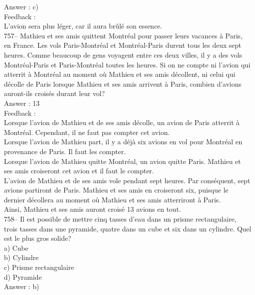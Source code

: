 ﻿\documentclass[letterpaper, 12pt]{article}
\begin{document}
Answer : c)\\

Feedback : \\
L'avion sera plus l\'eger, car il aura br\^ul\'e son essence.\\

757-- Mathieu et ses amis quittent Montr\'eal pour passer leurs vacances \`a
Paris, en France.  Les vols Paris-Montr\'eal et Montr\'eal-Paris durent tous
les deux sept heures.  Comme beaucoup de gens voyagent entre ces deux
villes, il y a des vols Montr\'eal-Paris et Paris-Montr\'eal toutes les
heures.  Si on ne compte ni l'avion qui atterrit \`a Montr\'eal au moment
o\`u Mathieu et ses amis d\'ecollent, ni celui qui d\'ecolle de Paris
lorsque Mathieu et ses amis arrivent \`a Paris, combien d'avions auront-ils
crois\'es durant leur vol?\\

Answer : 13\\

Feedback : \\
Lorsque l'avion de Mathieu et de ses amis d\'ecolle, un avion de Paris
atterrit \`a Montr\'eal. Cependant, il ne faut pas compter cet avion.\\
Lorsque l'avion de Mathieu part, il y a d\'ej\`a six avions en vol pour
Montr\'eal en provenance de Paris.  Il faut les compter.\\
Lorsque l'avion de Mathieu quitte Montr\'eal, un avion quitte Paris.
Mathieu et ses amis croiseront cet avion et il faut le compter.\\
L'avion de Mathieu et de ses amis vole pendant sept heures.  Par
cons\'equent, sept avions partiront de Paris.  Mathieu et ses amis en
croiseront six, puisque le dernier d\'ecollera au moment o\`u Mathieu et ses
amis atterriront \`a Paris.\\
Ainsi, Mathieu et ses amis auront crois\'e 13 avions en tout.  \\

758-- Il est possible de mettre cinq tasses d'eau dans un prisme
rectangulaire, trois tasses dans une pyramide, quatre dans un cube et six
dans un cylindre.  Quel est le plus gros solide?\\
a) Cube\\
b) Cylindre\\
c) Prisme rectangulaire\\
d) Pyramide\\

Answer : b)\\
\end{document}
